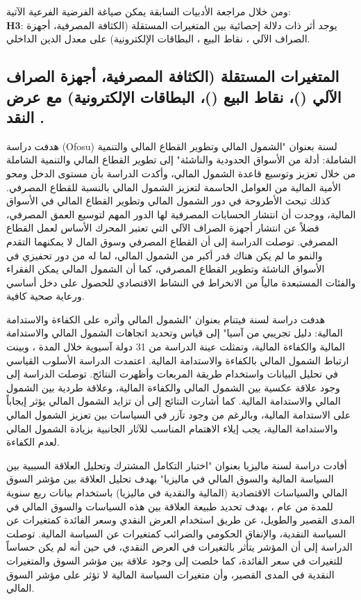\documentclass[10pt,a4paper]{report}
\begin{document}
\begin{doublespacing}
ومن خلال مراجعة الأدبيات السابقة يمكن صياغة الفرضية الفرعية الآتية: \\
	\textbf{H3}: يوجد أثر ذات دلالة إحصائية بين المتغيرات المستقلة (الكثافة المصرفية، أجهزة الصراف الآلي ، نقاط البيع ، البطاقات الإلكترونية) على معدل الدين الداخلي.
\subsection{المتغيرات المستقلة ({الكثافة المصرفية}، {أجهزة الصراف الآلي} ()، {نقاط البيع} ()، {البطاقات الإلكترونية}) مع عرض النقد  .
}
هدفت دراسة (Ofosu) لسنة  بعنوان "الشمول المالي وتطوير القطاع المالي والتنمية الشاملة: أدلة من الأسواق الحدودية والناشئة" إلى تطوير القطاع المالي والتنمية الشاملة من خلال تعزيز وتوسيع قاعدة الشمول المالي، وأكدت الدراسة بأن مستوى الدخل ومحو الأمية المالية من العوامل الحاسمة لتعزيز الشمول المالي بالنسبة للقطاع المصرفي. كذلك تبحث الأطروحة في دور الشمول المالي وتطوير القطاع المالي في الأسواق المالية، ووجدت أن انتشار الحسابات المصرفية لها الدور المهم لتوسيع العمق المصرفي، فضلاً عن انتشار أجهزة الصراف الآلي التي تعتبر المحرك الأساس لعمل القطاع المصرفي. توصلت الدراسة إلى أن القطاع المصرفي وسوق المال لا يمكنهما التقدم والنمو ما لم يكن هناك قدر أكبر من الشمول المالي، لما له من دور تحفيزي في الأسواق الناشئة وتطوير القطاع المصرفي، كما أن الشمول المالي يمكن الفقراء والفئات المستبعدة مالياً من الانخراط في النشاط الاقتصادي للحصول على دخل أساسي ورعاية صحية كافية.

هدفت دراسة  لسنة  فيتنام بعنوان "الشمول المالي وأثره على الكفاءة والاستدامة المالية: دليل تجريبي من آسيا" إلى قياس وتحديد اتجاهات الشمول المالي والاستدامة المالية والكفاءة المالية، وتمثلت عينة الدراسة من 31 دولة آسيوية خلال المدة ، وبينت ارتباط الشمول المالي بالكفاءة والاستدامة المالية. اعتمدت الدراسة الأسلوب القياسي في تحليل البيانات واستخدام طريقة المربعات وأظهرت النتائج. توصلت الدراسة إلى وجود علاقة عكسية بين الشمول المالي والكفاءة المالية، وعلاقة طردية بين الشمول المالي والاستدامة المالية. كما أشارت النتائج إلى أن تزايد الشمول المالي يؤثر إيجاباً على الاستدامة المالية، وبالرغم من وجود تآزر في السياسات بين تعزيز الشمول المالي والاستدامة المالية، يجب إيلاء الاهتمام المناسب للآثار الجانبية بزيادة الشمول المالي لعدم الكفاءة.

أفادت دراسة  لسنة  ماليزيا بعنوان "اختبار التكامل المشترك وتحليل العلاقة السببية بين السياسة المالية والسوق المالي في ماليزيا" بهدف تحليل العلاقة بين مؤشر السوق المالي والسياسات الاقتصادية (المالية والنقدية في ماليزيا) باستخدام بيانات ربع سنوية للمدة من عام ، بهدف تحديد طبيعة العلاقة بين هذه السياسات والسوق المالي في المدى القصير والطويل، عن طريق استخدام العرض النقدي وسعر الفائدة كمتغيرات عن السياسة النقدية، والإنفاق الحكومي والضرائب كمتغيرات عن السياسة المالية. توصلت الدراسة إلى أن المؤشر يتأثر بالتغيرات في العرض النقدي، في حين أنه لم يكن حساساً للتغيرات في سعر الفائدة، كما خلصت إلى وجود علاقة بين مؤشر السوق والمتغيرات النقدية في المدى القصير، وأن متغيرات السياسة المالية لا تؤثر على مؤشر السوق المالي.


\end{doublespacing}
\end{document}
